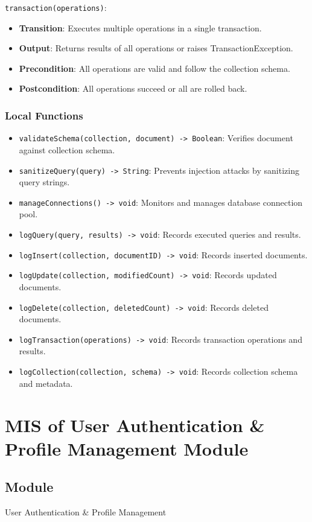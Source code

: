 \documentclass[12pt, titlepage]{article}
\begin{document}
\noindent \texttt{transaction(operations)}:
\begin{itemize}
    \item \textbf{Transition}: Executes multiple operations in a single transaction.
    \item \textbf{Output}: Returns results of all operations or raises TransactionException.
    \item \textbf{Precondition}: All operations are valid and follow the collection schema.
    \item \textbf{Postcondition}: All operations succeed or all are rolled back.
\end{itemize}

\subsubsection{Local Functions}
\begin{itemize}
    \item \texttt{validateSchema(collection, document) -> Boolean}: Verifies document against collection schema.
    \item \texttt{sanitizeQuery(query) -> String}: Prevents injection attacks by sanitizing query strings.
    \item \texttt{manageConnections() -> void}: Monitors and manages database connection pool.
    \item \texttt{logQuery(query, results) -> void}: Records executed queries and results.
    \item \texttt{logInsert(collection, documentID) -> void}: Records inserted documents.
    \item \texttt{logUpdate(collection, modifiedCount) -> void}: Records updated documents.
    \item \texttt{logDelete(collection, deletedCount) -> void}: Records deleted documents.
    \item \texttt{logTransaction(operations) -> void}: Records transaction operations and results.
    \item \texttt{logCollection(collection, schema) -> void}: Records collection schema and metadata.
\end{itemize}

\section{MIS of User Authentication \& Profile Management Module}

\subsection{Module}
User Authentication \& Profile Management
\end{document}
